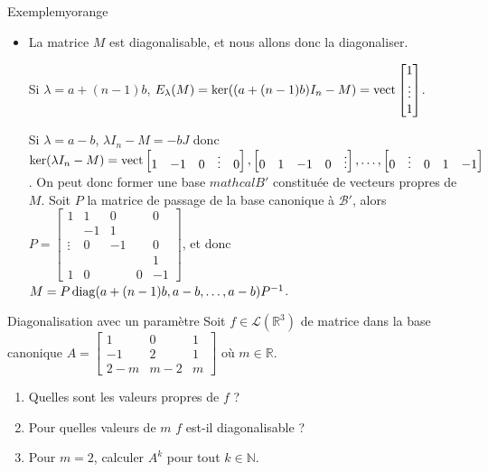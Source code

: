 \begin{omed}{Exemple}{myorange}
\begin{itemize}
            Si $\lambda = a-b$, on a $\lambda I_n - M = - b J$ donc $\rg(\lambda I_n - M) = 1$ et $\dim(E_{\lambda}(M)) = n - 1 = m_{\lambda}(M)$.
            \item La matrice $M$ est diagonalisable, et nous allons donc la diagonaliser.
            
            Si $\lambda = a + (n-1) b$, $E_{\lambda}(M) = \ker((a + (n-1)b) I_n - M) = \operatorname{vect}\begin{bmatrix}
                1 \\
                \vdots \\
                1
            \end{bmatrix}$.

            Si $\lambda = a-b$, $\lambda I_n - M = -b J$ donc $\ker(\lambda I_n - M ) = \operatorname{vect}\begin{bmatrix}
                1 & 
                -1 &
                0 &
                \vdots &
                0
            \end{bmatrix}, \begin{bmatrix}
                0 & 
                1 & 
                -1 &
                0 &
                \vdots
            \end{bmatrix}, \ldots, \begin{bmatrix}
                0 & 
                \vdots & 
                0 & 
                1 &
                -1
            \end{bmatrix}$. On peut donc former une base $mathcal{B}'$ constituée de vecteurs propres de $M$. Soit $P$ la matrice de passage de la base canonique à $\mathcal{B}'$, alors $P = \begin{bmatrix}
                1 & 1 & 0 & & 0 \\
                & -1 & 1 & & \\
                \vdots & 0 & -1 &  & 0 \\
                & & & & 1 \\
                1 & 0 & & 0 & -1
            \end{bmatrix}$, et donc $M = P \operatorname{diag}(a + (n-1)b, a - b, \ldots, a-b) P^{-1}$.
        \end{itemize}
    \end{omed}

\begin{exo}{Diagonalisation avec un paramètre}{}
    Soit $f \in \mathcal{L}(\mathbb{R}^3)$ de matrice dans la base canonique $A = \begin{bmatrix}
        1 & 0 & 1 \\
        -1 & 2 & 1 \\
        2-m & m-2 & m
    \end{bmatrix}$ où $m \in \mathbb{R}$.
    \begin{enumerate}
        \item Quelles sont les valeurs propres de $f$ ?
        \item Pour quelles valeurs de $m$ $f$ est-il diagonalisable ?
        \item Pour $m = 2$, calculer $A^k$ pour tout $k \in \mathbb{N}$.
    \end{enumerate}
\end{exo}

